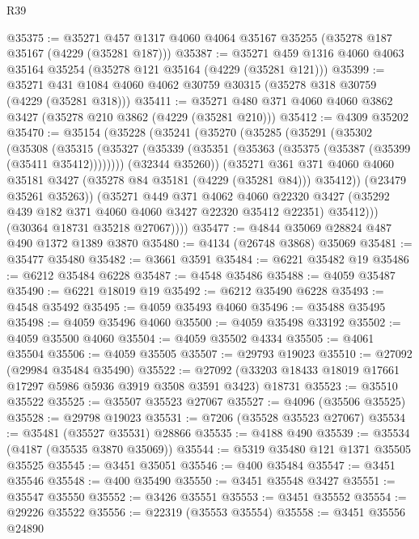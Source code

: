 \begin{lexlean}{R39}
\begin{coremodule}
@35375 := @35271 @457 @1317 @4060 @4064 @35167 @35255 (@35278 @187 @35167 (@4229 (@35281 @187)))
@35387 := @35271 @459 @1316 @4060 @4063 @35164 @35254 (@35278 @121 @35164 (@4229 (@35281 @121)))
@35399 := @35271 @431 @1084 @4060 @4062 @30759 @30315 (@35278 @318 @30759 (@4229 (@35281 @318)))
@35411 := @35271 @480 @371 @4060 @4060 @3862 @3427 (@35278 @210 @3862 (@4229 (@35281 @210)))
@35412 := @4309 @35202
@35470 := @35154
    (@35228
      (@35241
        (@35270
          (@35285
            (@35291
              (@35302
                (@35308
                  (@35315
                    (@35327 (@35339 (@35351 (@35363 (@35375 (@35387 (@35399 (@35411 @35412))))))))
                    (@32344 @35260))
                  (@35271
                    @361
                    @371
                    @4060
                    @4060
                    @35181
                    @3427
                    (@35278 @84 @35181 (@4229 (@35281 @84)))
                    @35412))
                (@23479 @35261 @35263))
              (@35271
                @449
                @371
                @4062
                @4060
                @22320
                @3427
                (@35292 @439 @182 @371 @4060 @4060 @3427 @22320 @35412 @22351)
                @35412)))
          (@30364 @18731 @35218 @27067))))
@35477 := @4844 @35069 @28824 @487 @490 @1372 @1389 @3870
@35480 := @4134 (@26748 @3868) @35069
@35481 := @35477 @35480
@35482 := @3661 @3591
@35484 := @6221 @35482 @19
@35486 := @6212 @35484 @6228
@35487 := @4548 @35486
@35488 := @4059 @35487
@35490 := @6221 @18019 @19
@35492 := @6212 @35490 @6228
@35493 := @4548 @35492
@35495 := @4059 @35493 @4060
@35496 := @35488 @35495
@35498 := @4059 @35496 @4060
@35500 := @4059 @35498 @33192
@35502 := @4059 @35500 @4060
@35504 := @4059 @35502 @4334
@35505 := @4061 @35504
@35506 := @4059 @35505
@35507 := @29793 @19023
@35510 := @27092 (@29984 @35484 @35490)
@35522 := @27092 (@33203 @18433 @18019 @17661 @17297 @5986 @5936 @3919 @3508 @3591 @3423) @18731
@35523 := @35510 @35522
@35525 := @35507 @35523 @27067
@35527 := @4096 (@35506 @35525)
@35528 := @29798 @19023
@35531 := @7206 (@35528 @35523 @27067)
@35534 := @35481 (@35527 @35531) @28866
@35535 := @4188 @490
@35539 := @35534 (@4187 (@35535 @3870 @35069))
@35544 := @5319 @35480 @121 @1371 @35505 @35525
@35545 := @3451 @35051
@35546 := @400 @35484
@35547 := @3451 @35546
@35548 := @400 @35490
@35550 := @3451 @35548 @3427
@35551 := @35547 @35550
@35552 := @3426 @35551
@35553 := @3451 @35552
@35554 := @29226 @35522
@35556 := @22319 (@35553 @35554)
@35558 := @3451 @35556 @24890

\end{coremodule}
\end{lexlean}
